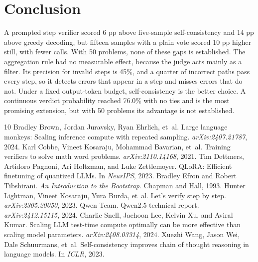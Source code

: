 \documentclass{article}
\begin{document}
\section{Conclusion}
A prompted step verifier scored 6 pp above five-sample self-consistency and 14 pp above greedy decoding, but fifteen samples with a plain vote scored 10 pp higher still, with fewer calls. With 50 problems, none of these gaps is established. The aggregation rule had no measurable effect, because the judge acts mainly as a filter. Its precision for invalid steps is 45\%, and a quarter of incorrect paths pass every step, so it detects errors that appear in a step and misses errors that do not. Under a fixed output-token budget, self-consistency is the better choice. A continuous verdict probability reached 76.0\% with no ties and is the most promising extension, but with 50 problems its advantage is not established.

\small
\begin{thebibliography}{10}
Bradley Brown, Jordan Juravsky, Ryan Ehrlich, et~al. Large language monkeys: Scaling inference compute with repeated sampling. \emph{arXiv:2407.21787}, 2024.
Karl Cobbe, Vineet Kosaraju, Mohammad Bavarian, et~al. Training verifiers to solve math word problems. \emph{arXiv:2110.14168}, 2021.
Tim Dettmers, Artidoro Pagnoni, Ari Holtzman, and Luke Zettlemoyer. QLoRA: Efficient finetuning of quantized LLMs. In \emph{NeurIPS}, 2023.
Bradley Efron and Robert Tibshirani. \emph{An Introduction to the Bootstrap}. Chapman and Hall, 1993.
Hunter Lightman, Vineet Kosaraju, Yura Burda, et~al. Let's verify step by step. \emph{arXiv:2305.20050}, 2023.
Qwen Team. Qwen2.5 technical report. \emph{arXiv:2412.15115}, 2024.
Charlie Snell, Jaehoon Lee, Kelvin Xu, and Aviral Kumar. Scaling LLM test-time compute optimally can be more effective than scaling model parameters. \emph{arXiv:2408.03314}, 2024.
Xuezhi Wang, Jason Wei, Dale Schuurmans, et~al. Self-consistency improves chain of thought reasoning in language models. In \emph{ICLR}, 2023.
\end{thebibliography}
\end{document}
